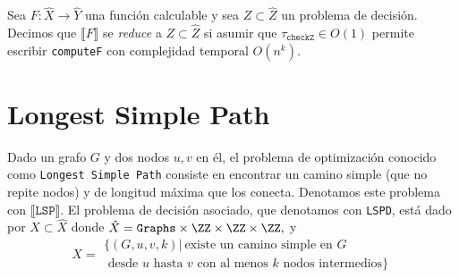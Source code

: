 \begin{dfn}
	Sea
	\(
		F : \hat{X} \to \hat{Y}
	\)
	una función calculable y sea
	\(
		Z \subset \hat{Z}
	\)
	un problema de decisión. Decimos que
	\(
		\llbracket
			F
		\rrbracket
	\)
	se \emph{reduce} a
	\(
		Z \subset \hat{Z}
	\)
	si asumir que
	\(
		\tau_{\texttt{checkZ}} \in O(1)
	\)
	permite escribir \texttt{computeF} con complejidad temporal
	\(
		O(n^k)
	\).
\end{dfn}

\section{Longest Simple Path}
Dado un grafo $G$ y dos nodos $u,v$ en él, el problema de optimización conocido
como \texttt{Longest Simple Path} consiste en encontrar un camino simple (que
no repite nodos) y de longitud máxima que los conecta. Denotamos este problema
con 
\(
	\llbracket
	\mathtt{LSP}
	\rrbracket.
\)
El problema de decisión asociado, que denotamos con \texttt{LSPD}, está dado por
$X \subset \hat{X}$ donde
\(
	\hat{X}= \mathtt{Graphs} \times \ZZ \times \ZZ \times \ZZ,
\)
y
\[
	X=
	\begin{array}{l}
	\{
		(G, u, v, k) \vert \ \mbox{existe un camino simple en $G$}\\
		\mbox{\ \ desde $u$ hasta $v$ con al menos $k$ nodos intermedios}
	\}
	\end{array}
\]

